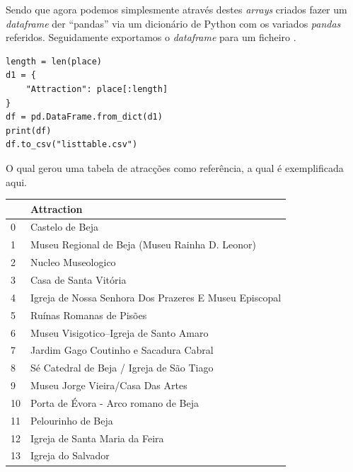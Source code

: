 \documentclass[a4paper,10pt]{article}
\begin{document}
Sendo que agora podemos simplesmente através destes \textit{arrays} criados fazer um \textit{dataframe} der ``pandas'' via um dicionário de Python com os variados \textit{pandas} referidos. Seguidamente exportamos o \textit{dataframe} para um ficheiro .

\begin{verbatim}
length = len(place)
d1 = {
    "Attraction": place[:length]
}
df = pd.DataFrame.from_dict(d1)
print(df)
df.to_csv("listtable.csv")
\end{verbatim}

\newpage

O qual gerou uma tabela de atracções como referência, a qual é exemplificada aqui.

\begin{table}[!ht]
  \centering
  \begin{tabular}{|l|l|}
    \hline
    ~  & Attraction                                             \\ \hline
    0  & Castelo de Beja                                        \\ \hline
    1  & Museu Regional de Beja (Museu Rainha D. Leonor)        \\ \hline
    2  & Nucleo Museologico                                     \\ \hline
    3  & Casa de Santa Vitória                                  \\ \hline
    4  & Igreja de Nossa Senhora Dos Prazeres E Museu Episcopal \\ \hline
    5  & Ruínas Romanas de Pisões                               \\ \hline
    6  & Museu Visigotico--Igreja de Santo Amaro                \\ \hline
    7  & Jardim Gago Coutinho e Sacadura Cabral                 \\ \hline
    8  & Sé Catedral de Beja / Igreja de São Tiago              \\ \hline
    9  & Museu Jorge Vieira/Casa Das Artes                      \\ \hline
    10 & Porta de Évora - Arco romano de Beja                   \\ \hline
    11 & Pelourinho de Beja                                     \\ \hline
    12 & Igreja de Santa Maria da Feira                         \\ \hline
    13 & Igreja do Salvador                                     \\ \hline

\end{tabular}
\end{table}
\end{document}
